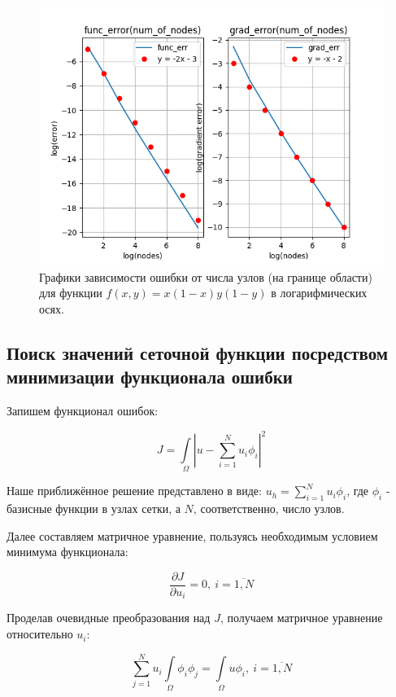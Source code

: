 \documentclass[12pt]{article}
\begin{document}
\begin{figure}[H] \label{fig1}
\centerline{\includegraphics[scale = 0.9]{Figure_3.png}}
\caption{Графики зависимости ошибки от числа узлов (на границе области) 
для функции $f(x, y) = x(1-x)y(1-y)$ в логарифмических осях.}
\end{figure} 

\subsection{Поиск значений сеточной функции посредством минимизации функционала ошибки}

Запишем функционал ошибок:

\begin{equation}
 J = \int\limits_{\Omega}|u - \sum_{i=1}^N u_i \phi_i|^2
\end{equation}

Наше приближённое решение представлено в виде: $u_h = \sum\limits_{i=1}^N u_i \phi_i$, где $\phi_i$ - базисные функции в узлах сетки, а $N$, соответственно, число узлов.

Далее составляем матричное уравнение, пользуясь необходимым условием минимума функционала:

\begin{equation}
 \dfrac{\partial J}{\partial u_i} = 0, \ i = \overline{1, N}
\end{equation}

Проделав очевидные преобразования над $J$, получаем матричное уравнение относительно $u_i$:

\begin{equation}
 \sum_{j=1}^{N}u_i\int\limits_{\Omega}\phi_i \phi_j = \int\limits_{\Omega} u \phi_i, \
 i = \overline{1, N}
\end{equation}
\end{document}
